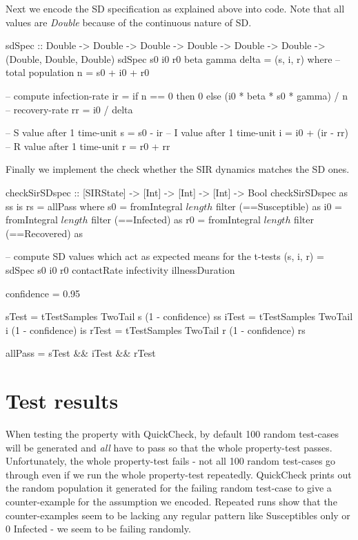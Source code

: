 Next we encode the SD specification as explained above into code. Note that all values are \textit{Double} because of the continuous nature of SD.

\begin{HaskellCode}
sdSpec :: Double 
       -> Double
       -> Double
       -> Double 
       -> Double
       -> Double
       -> (Double, Double, Double)
sdSpec s0 i0 r0 beta gamma delta = (s, i, r)
  where
  	-- total population
    n = s0 + i0 + r0

    -- compute infection-rate
    ir = if n == 0 then 0 else (i0 * beta * s0 * gamma) / n
    -- recovery-rate
    rr = i0 / delta

    -- S value after 1 time-unit
    s = s0 - ir
    -- I value after 1 time-unit
    i = i0 + (ir - rr)
    -- R value after 1 time-unit
    r = r0 + rr
\end{HaskellCode}

Finally we implement the check whether the SIR dynamics matches the SD ones.

\begin{HaskellCode}
checkSirSDspec :: [SIRState] 
               -> [Int]
               -> [Int]
               -> [Int]
               -> Bool
checkSirSDspec as ss is rs = allPass
  where
    s0 = fromIntegral $ length $ filter (==Susceptible) as
    i0 = fromIntegral $ length $ filter (==Infected) as
    r0 = fromIntegral $ length $ filter (==Recovered) as
    
    -- compute SD values which act as expected means for the t-tests
    (s, i, r) = sdSpec s0 i0 r0 contactRate infectivity illnessDuration
    
    confidence = 0.95

    sTest = tTestSamples TwoTail s (1 - confidence) ss
    iTest = tTestSamples TwoTail i (1 - confidence) is
    rTest = tTestSamples TwoTail r (1 - confidence) rs

    allPass = sTest && iTest && rTest
\end{HaskellCode}

\section{Test results}
When testing the property with QuickCheck, by default 100 random test-cases will be generated and \textit{all} have to pass so that the whole property-test passes. Unfortunately, the whole property-test fails - not all 100 random test-cases go through even if we run the whole property-test repeatedly. QuickCheck prints out the random population it generated for the failing random test-case to give a counter-example for the assumption we encoded. Repeated runs show that the counter-examples seem to be lacking any regular pattern like Susceptibles only or 0 Infected - we seem to be failing randomly.

